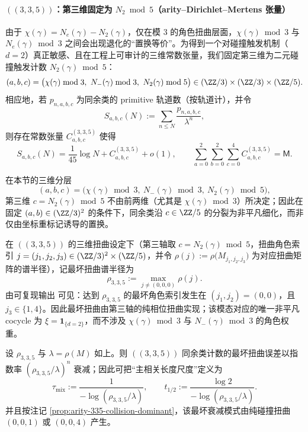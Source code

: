 \paragraph{\texorpdfstring{$((3,3,5))$}{(3,3,5)}：第三维固定为 \texorpdfstring{$N_2\bmod 5$}{N2 mod 5}（arity--Dirichlet--Mertens 张量）}
由于 $\chi(\gamma)=N_e(\gamma)-N_2(\gamma)$，仅在模 $3$ 的角色扭曲层面，$\chi(\gamma)\bmod 3$ 与 $N_e(\gamma)\bmod 3$ 之间会出现退化的“置换等价”。为得到一个对碰撞触发机制（$d=2$）真正敏感、且在工程上可审计的三维常数张量，我们固定第三维为二元碰撞触发计数
\(
N_2(\gamma)\bmod 5
\)：
$$
(a,b,c)=\bigl(\chi(\gamma)\bmod 3,\ N_-(\gamma)\bmod 3,\ N_2(\gamma)\bmod 5\bigr)\in(\ZZ/3)\times(\ZZ/3)\times(\ZZ/5).
$$
相应地，若 $p_{n,a,b,c}$ 为同余类的 primitive 轨道数（按轨道计），并令
$$
S_{a,b,c}(N):=\sum_{n\le N}\frac{p_{n,a,b,c}}{\lambda^n},
$$
则存在常数张量 $C^{(3,3,5)}_{a,b,c}$ 使得
$$
S_{a,b,c}(N)=\frac{1}{45}\log N + C^{(3,3,5)}_{a,b,c}+o(1),
\qquad
\sum_{a=0}^2\sum_{b=0}^2\sum_{c=0}^4 C^{(3,3,5)}_{a,b,c}=\mathsf{M}.
$$
\begin{remark}\label{prop:arity-335-n2-nondegenerate}
在本节的三维分层
$$
(a,b,c)=\bigl(\chi(\gamma)\bmod 3,\ N_-(\gamma)\bmod 3,\ N_2(\gamma)\bmod 5\bigr),
$$
第三维 $c=N_2(\gamma)\bmod 5$ 不由前两维（尤其是 $\chi(\gamma)\bmod 3$）所决定；因此在固定 $(a,b)\in(\ZZ/3)^2$ 的条件下，同余类沿 $c\in\ZZ/5$ 的分裂为非平凡细化，而非仅由坐标重标记诱导的置换。
\end{remark}

\begin{remark}\label{prop:arity-335-collision-dominant}
在 \(((3,3,5))\) 的三维扭曲设定下（第三轴取 $c=N_2(\gamma)\bmod 5$，扭曲角色索引 $j=(j_1,j_2,j_3)\in(\ZZ/3)^2\times(\ZZ/5)$，并令
\(
\rho(j):=\rho\bigl(M_{j_1,j_2,j_3}\bigr)
\)
为对应扭曲矩阵的谱半径），记最坏扭曲谱半径为
$$
\rho_{3,3,5}:=\max_{j\neq (0,0,0)}\rho(j).
$$
由可复现输出
\verb||
可见：达到 $\rho_{3,3,5}$ 的最坏角色索引发生在 $(j_1,j_2)=(0,0)$，且 $j_3\in\{1,4\}$。因此最坏扭曲由第三轴的纯相位扭曲实现；该模态对应的唯一非平凡 cocycle 为
\(
\xi=\mathbf{1}_{\{d=2\}}
\)，而不涉及 $\chi(\gamma)\bmod 3$ 与 $N_-(\gamma)\bmod 3$ 的角色权重。
\end{remark}

\begin{remark}\label{cor:arity-335-collision-mixing-scale}
设 \(\rho_{3,3,5}\) 与 \(\lambda=\rho(M)\) 如上。则 \(((3,3,5))\) 同余类计数的最坏扭曲误差以指数率
\(
(\rho_{3,3,5}/\lambda)^n
\)
衰减；因此可把“主相关长度尺度”定义为
$$
\tau_{\mathrm{mix}}:=\frac{1}{-\log(\rho_{3,3,5}/\lambda)},
\qquad
t_{1/2}:=\frac{\log 2}{-\log(\rho_{3,3,5}/\lambda)}.
$$
并且按注记 \ref{prop:arity-335-collision-dominant}，该最坏衰减模式由纯碰撞扭曲 $(0,0,1)$ 或 $(0,0,4)$ 产生。
\end{remark}

